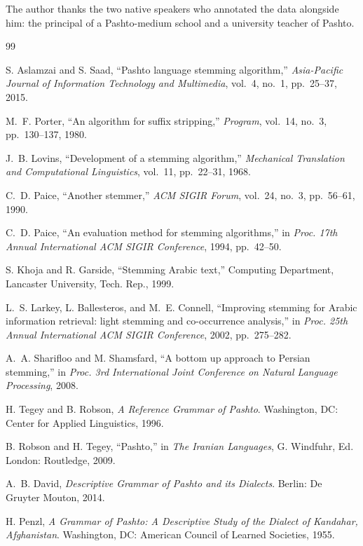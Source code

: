 \documentclass[conference]{IEEEtran}
\begin{document}
The author thanks the two native speakers who annotated the data alongside him:
the principal of a Pashto-medium school and a university teacher of Pashto.

\begin{thebibliography}{99}

S. Aslamzai and S. Saad, ``Pashto language stemming algorithm,''
\emph{Asia-Pacific Journal of Information Technology and Multimedia},
vol.~4, no.~1, pp.~25--37, 2015.

M.~F. Porter, ``An algorithm for suffix stripping,''
\emph{Program}, vol.~14, no.~3, pp.~130--137, 1980.

J.~B. Lovins, ``Development of a stemming algorithm,''
\emph{Mechanical Translation and Computational Linguistics}, vol.~11,
pp.~22--31, 1968.

C.~D. Paice, ``Another stemmer,'' \emph{ACM SIGIR Forum}, vol.~24, no.~3,
pp.~56--61, 1990.

C.~D. Paice, ``An evaluation method for stemming algorithms,'' in
\emph{Proc. 17th Annual International ACM SIGIR Conference}, 1994,
pp.~42--50.

S. Khoja and R. Garside, ``Stemming Arabic text,'' Computing Department,
Lancaster University, Tech. Rep., 1999.

L.~S. Larkey, L. Ballesteros, and M.~E. Connell, ``Improving stemming for
Arabic information retrieval: light stemming and co-occurrence analysis,''
in \emph{Proc. 25th Annual International ACM SIGIR Conference}, 2002,
pp.~275--282.

A.~A. Sharifloo and M. Shamsfard, ``A bottom up approach to Persian
stemming,'' in \emph{Proc. 3rd International Joint Conference on Natural
Language Processing}, 2008.

H. Tegey and B. Robson, \emph{A Reference Grammar of Pashto}.
Washington, DC: Center for Applied Linguistics, 1996.

B. Robson and H. Tegey, ``Pashto,'' in \emph{The Iranian Languages},
G. Windfuhr, Ed. London: Routledge, 2009.

A.~B. David, \emph{Descriptive Grammar of Pashto and its Dialects}.
Berlin: De Gruyter Mouton, 2014.

H. Penzl, \emph{A Grammar of Pashto: A Descriptive Study of the Dialect of
Kandahar, Afghanistan}. Washington, DC: American Council of Learned Societies,
1955.


\end{thebibliography}
\end{document}

